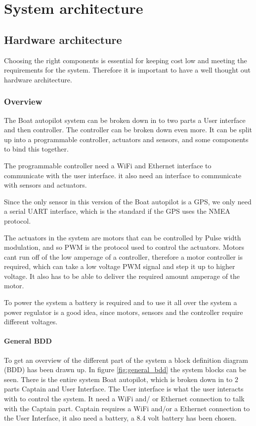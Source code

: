 \chapter{System architecture}
\label{sec:sys-architecture}


\section{Hardware architecture}
Choosing the right components is essential for keeping cost low and meeting the requirements for the system. Therefore it is important to have a well thought out hardware architecture. 

\subsection{Overview}
The Boat autopilot system can be broken down in to two parts a User interface and then controller.
The controller can be broken down even more. It can be split up into a programmable controller, actuators and sensors, and some components to bind this together.

The programmable controller need a WiFi and Ethernet interface to communicate with the user interface. it also need an interface to communicate with sensors and actuators. 

Since the only sensor in this version of the Boat autopilot is a GPS, we only need a serial UART interface, which is the standard if the GPS uses the NMEA protocol. 

The actuators in the system are motors that can be controlled by Pulse width modulation, and so PWM is the protocol used to control the actuators. Motors cant run off of the low amperage of a controller, therefore a motor controller is required, which can take a low voltage PWM signal and step it up to higher voltage. It also has to be able to deliver the required amount amperage of the motor. 

To power the system a battery is required and to use it all over the system a power regulator is a good idea, since motors, sensors and the controller require different voltages.

\subsubsection{General BDD}

To get an overview of the different part of the system a block definition diagram (BDD) has been drawn up.
In figure \ref{fig:general_bdd} the system blocks can be seen. There is the entire system Boat autopilot, which is broken down in to 2 parts Captain and User Interface. The User interface is what the user interacts with to control the system. It need a WiFi and/ or Ethernet connection to talk with the Captain part. Captain requires a WiFi and/or a Ethernet connection to the User Interface, it also need a battery, a 8.4 volt battery has been chosen. 

